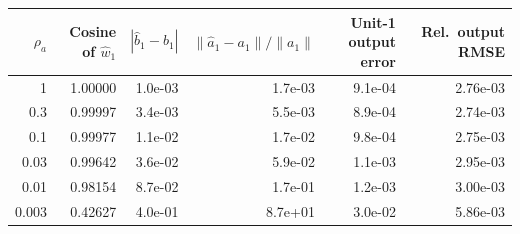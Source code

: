 \begin{tabular}{r r r r r r}
\toprule
$\rho_a$ & Cosine of $\hat w_1$ & $|\hat b_1-b_1|$ & $\|\hat a_1-a_1\|/\|a_1\|$ & Unit-1 output error & Rel.\ output RMSE\\
\midrule
1 & 1.00000 & 1.0e-03 & 1.7e-03 & 9.1e-04 & 2.76e-03 \\
0.3 & 0.99997 & 3.4e-03 & 5.5e-03 & 8.9e-04 & 2.74e-03 \\
0.1 & 0.99977 & 1.1e-02 & 1.7e-02 & 9.8e-04 & 2.75e-03 \\
0.03 & 0.99642 & 3.6e-02 & 5.9e-02 & 1.1e-03 & 2.95e-03 \\
0.01 & 0.98154 & 8.7e-02 & 1.7e-01 & 1.2e-03 & 3.00e-03 \\
0.003 & 0.42627 & 4.0e-01 & 8.7e+01 & 3.0e-02 & 5.86e-03 \\
\bottomrule
\end{tabular}
